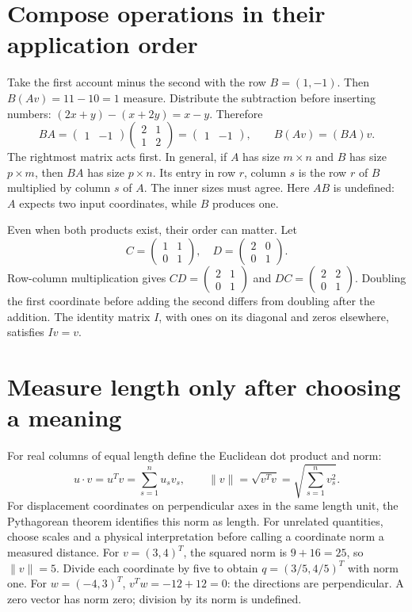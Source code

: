 \section{Compose operations in their application order}
Take the first account minus the second with the row $B=(1,-1)$.
Then $B(Av)=11-10=1$ measure. Distribute the subtraction before inserting
numbers: $(2x+y)-(x+2y)=x-y$. Therefore
\[
 BA=\begin{pmatrix}1&-1\end{pmatrix}
     \begin{pmatrix}2&1\\1&2\end{pmatrix}
   =\begin{pmatrix}1&-1\end{pmatrix},\qquad B(Av)=(BA)v.
\]
The rightmost matrix acts first. In general, if $A$ has size $m\times n$
and $B$ has size $p\times m$, then $BA$ has size $p\times n$.
Its entry in row $r$, column $s$ is the row $r$ of $B$ multiplied by
column $s$ of $A$. The inner sizes must agree. Here $AB$ is undefined:
$A$ expects two input coordinates, while $B$ produces one.

Even when both products exist, their order can matter. Let
\[
 C=\begin{pmatrix}1&1\\0&1\end{pmatrix},\quad
 D=\begin{pmatrix}2&0\\0&1\end{pmatrix}.
\]
Row-column multiplication gives $CD=\begin{pmatrix}2&1\\0&1\end{pmatrix}$
and $DC=\begin{pmatrix}2&2\\0&1\end{pmatrix}$.
Doubling the first coordinate before adding the second differs from doubling
after the addition. The identity matrix $I$, with ones on its diagonal and
zeros elsewhere, satisfies $Iv=v$.

\section{Measure length only after choosing a meaning}
For real columns of equal length define the Euclidean dot product and norm:
\[
 u\mathbin{\cdot}v=u^Tv=\sum_{s=1}^n u_sv_s,\qquad
 \|v\|=\sqrt{v^Tv}=\sqrt{\sum_{s=1}^n v_s^2}.
\]
For displacement coordinates on perpendicular axes in the same length unit,
the Pythagorean theorem identifies this norm as length. For unrelated
quantities, choose scales and a physical interpretation before calling a
coordinate norm a measured distance.
For $v=(3,4)^T$, the squared norm is $9+16=25$, so $\|v\|=5$.
Divide each coordinate by five to obtain $q=(3/5,4/5)^T$ with norm one.
For $w=(-4,3)^T$, $v^Tw=-12+12=0$: the directions are perpendicular.
A zero vector has norm zero; division by its norm is undefined.

